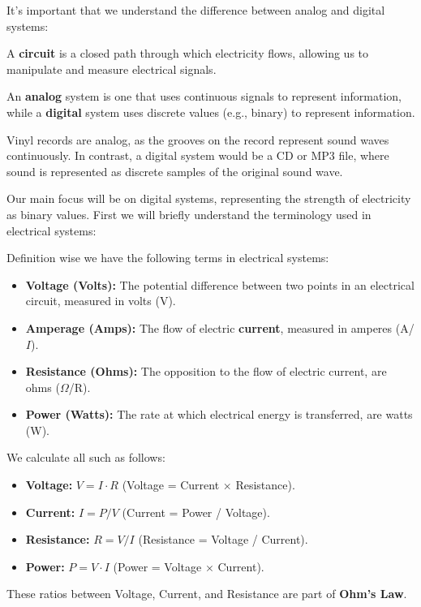 \newpage 

\noindent
It's important that we understand the difference between analog and digital systems:
\begin{Def}

    \label{def:analog_digital}

    A \textbf{circuit} is a closed path through which electricity flows, allowing us to manipulate and measure electrical signals.
    
    An \textbf{analog} system is one that uses continuous signals to represent information, while a \textbf{digital} system uses discrete values (e.g., binary) to represent information.
\end{Def}

\begin{Example}

    \noindent
    Vinyl records are analog, as the grooves on the record represent sound waves continuously. 
    In contrast, a digital system would be a CD or MP3 file, where sound is represented as discrete samples of the original sound wave.
\end{Example}

\noindent
Our main focus will be on digital systems, representing the strength of electricity as binary values.
First we will briefly understand the terminology used in electrical systems:
\begin{Def}

    \label{def:voltage_amps_watts}

    Definition wise we have the following terms in electrical systems:
    \begin{itemize}
        \item \textbf{Voltage (Volts):} The potential difference between two points in an electrical circuit, measured in volts (V).
        \item \textbf{Amperage (Amps):} The flow of electric \textbf{current}, measured in amperes (A/$I$).
        \item \textbf{Resistance (Ohms):} The opposition to the flow of electric current, are ohms ($\Omega$/R).
        \item \textbf{Power (Watts):} The rate at which electrical energy is transferred, are watts (W).
    \end{itemize}

    \noindent
    We calculate all such as follows:
    \begin{itemize}
        \item \textbf{Voltage:} $V = I \cdot R$ (Voltage = Current $\times$ Resistance).
        \item \textbf{Current:} $I = P / V$ (Current = Power / Voltage).
        \item \textbf{Resistance:} $R = V / I$ (Resistance = Voltage / Current).
        \item \textbf{Power:} $P = V \cdot I$ (Power = Voltage $\times$ Current).
    \end{itemize}

    \noindent
    These ratios between Voltage, Current, and Resistance are part of \textbf{Ohm's Law}.
\end{Def}


